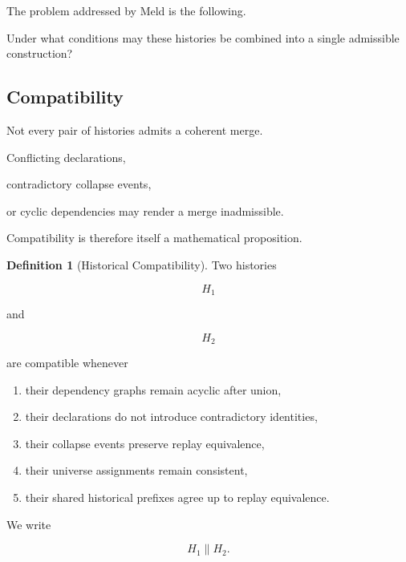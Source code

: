 \documentclass[12pt,oneside]{article}
\theoremstyle{definition}
\newtheorem{definition}[theorem]{Definition}
\theoremstyle{remark}
\begin{document}
The problem addressed by Meld is the following.

Under what conditions may these histories be combined into a single admissible
construction?

\subsection{Compatibility}

Not every pair of histories admits a coherent merge.

Conflicting declarations,

contradictory collapse events,

or cyclic dependencies may render a merge inadmissible.

Compatibility is therefore itself a mathematical proposition.

\begin{definition}[Historical Compatibility]

Two histories

\[
H_1
\]

and

\[
H_2
\]

are compatible whenever

\begin{enumerate}

\item

their dependency graphs remain acyclic after union,

\item

their declarations do not introduce contradictory identities,

\item

their collapse events preserve replay equivalence,

\item

their universe assignments remain consistent,

\item

their shared historical prefixes agree up to replay equivalence.

\end{enumerate}

We write

\[
H_1
\parallel
H_2.
\]

\end{definition}
\end{document}
